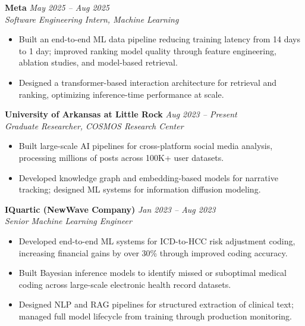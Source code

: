 \documentclass[10pt]{article}
\begin{document}
\vspace{2pt}
\noindent\textbf{Meta} \hfill \textit{May 2025 -- Aug 2025} \\
\textit{Software Engineering Intern, Machine Learning}
\begin{itemize}
  \item Built an end-to-end ML data pipeline reducing training latency from 14 days to 1 day; improved ranking model quality through feature engineering, ablation studies, and model-based retrieval.
  \item Designed a transformer-based interaction architecture for retrieval and ranking, optimizing inference-time performance at scale.
\end{itemize}

\vspace{2pt}
\noindent\textbf{University of Arkansas at Little Rock} \hfill \textit{Aug 2023 -- Present} \\
\textit{Graduate Researcher, COSMOS Research Center}
\begin{itemize}
  \item Built large-scale AI pipelines for cross-platform social media analysis, processing millions of posts across 100K+ user datasets.
  \item Developed knowledge graph and embedding-based models for narrative tracking; designed ML systems for information diffusion modeling.
\end{itemize}

\vspace{2pt}
\noindent\textbf{IQuartic (NewWave Company)} \hfill \textit{Jan 2023 -- Aug 2023} \\
\textit{Senior Machine Learning Engineer}
\begin{itemize}
  \item Developed end-to-end ML systems for ICD-to-HCC risk adjustment coding, increasing financial gains by over 30\% through improved coding accuracy.
  \item Built Bayesian inference models to identify missed or suboptimal medical coding across large-scale electronic health record datasets.
  \item Designed NLP and RAG pipelines for structured extraction of clinical text; managed full model lifecycle from training through production monitoring.
\end{itemize}
\end{document}
